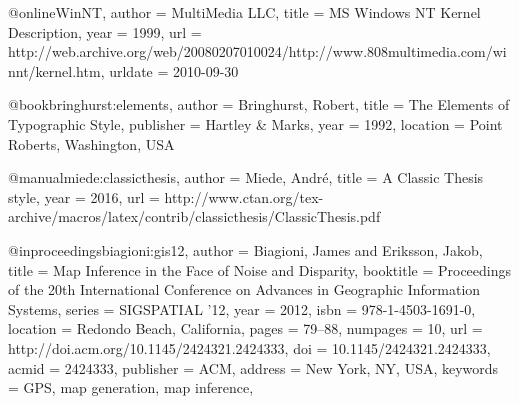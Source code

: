 @online{WinNT,
  author = {MultiMedia LLC},
  title = {{MS Windows NT} Kernel Description},
  year = 1999,
  url = {http://web.archive.org/web/20080207010024/http://www.808multimedia.com/winnt/kernel.htm},
  urldate = {2010-09-30}
}

@book{bringhurst:elements,
    author    = {Bringhurst, Robert},
    title     = {The Elements of Typographic Style},
    publisher = {Hartley \& Marks},
    year      = {1992},
    location  = {Point Roberts, Washington, USA}
}

@manual{miede:classicthesis, 
	author    = {Miede, Andr\'e},
	title     = {A Classic Thesis style}, 
	year      = {2016},
	url       = {http://www.ctan.org/tex-archive/macros/latex/contrib/classicthesis/ClassicThesis.pdf}
}

@inproceedings{biagioni:gis12,
    author    = {Biagioni, James and Eriksson, Jakob},
    title     = {Map Inference in the Face of Noise and Disparity},
    booktitle = {Proceedings of the 20th International Conference on Advances in Geographic Information Systems},
    series    = {SIGSPATIAL '12},
    year      = {2012},
    isbn      = {978-1-4503-1691-0},
    location  = {Redondo Beach, California},
    pages     = {79--88},
    numpages  = {10},
    url       = {http://doi.acm.org/10.1145/2424321.2424333},
    doi       = {10.1145/2424321.2424333},
    acmid     = {2424333},
    publisher = {ACM},
    address   = {New York, NY, USA},
    keywords  = {GPS, map generation, map inference},
}

